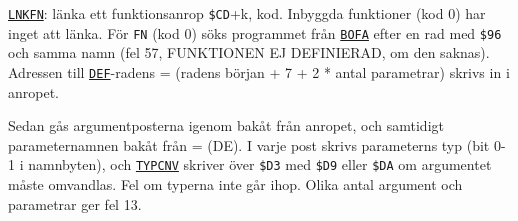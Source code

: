 \begin{Listing}
\Gap
\begin{Cmt}\par\noindent \hyperlink{l:LNKFN}{\texttt{LNKFN}}: länka ett funktionsanrop \texttt{\$CD}+k, kod. Inbyggda funktioner (kod {}{} 0) har inget att länka. För \texttt{FN} (kod 0) söks programmet från \hyperlink{v:BOFA}{\texttt{BOFA}} efter en rad med \texttt{\$96} och samma namn (fel 57, FUNKTIONEN EJ DEFINIERAD, om den saknas). Adressen till \hyperlink{l:DEF}{\texttt{DEF}}-radens {}={} (radens början + 7 + 2 * antal parametrar) skrivs in i anropet.\par
\par\noindent Sedan gås argumentposterna igenom bakåt från anropet, och samtidigt parameternamnen bakåt från {}={} (DE). I varje post skrivs parameterns typ (bit 0\mbox{-}1 i namnbyten), och \hyperlink{l:TYPCNV}{\texttt{TYPCNV}} skriver över \texttt{\$D3} med \texttt{\$D9} eller \texttt{\$DA} om argumentet måste omvandlas. Fel om typerna inte går ihop. Olika antal argument och parametrar ger fel 13.\par\end{Cmt}

\end{Listing}
